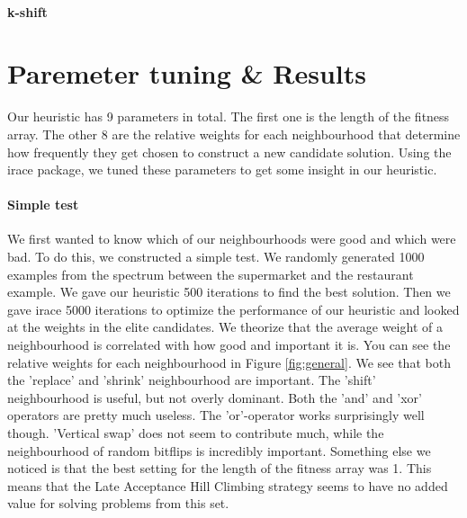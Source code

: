 \documentclass[]{article}
\begin{document}
\paragraph{k-shift}

\section{Paremeter tuning \& Results}
Our heuristic has 9 parameters in total. The first one is the length of the fitness array. The other 8 are the relative weights for each neighbourhood that determine how frequently they get chosen to construct a new candidate solution. Using the irace package, we tuned these parameters to get some insight in our heuristic.

\paragraph{Simple test}
We first wanted to know which of our neighbourhoods were good and which were bad. To do this, we constructed a simple test. We randomly generated 1000 examples from the spectrum between the supermarket and the restaurant example. We gave our heuristic 500 iterations to find the best solution. Then we gave irace 5000 iterations to optimize the performance of our heuristic and looked at the weights in the elite candidates. We theorize that the average weight of a neighbourhood is correlated with how good and important it is. You can see the relative weights for each neighbourhood in Figure \ref{fig:general}. We see that both the 'replace' and 'shrink' neighbourhood are important. The 'shift' neighbourhood is useful, but not overly dominant. Both the 'and' and 'xor' operators are pretty much useless. The 'or'-operator works surprisingly well though. 'Vertical swap' does not seem to contribute much, while the neighbourhood of random bitflips is incredibly important. Something else we noticed is that the best setting for the length of the fitness array was 1. This means that the Late Acceptance Hill Climbing strategy seems to have no added value for solving problems from this set.

\end{document}
